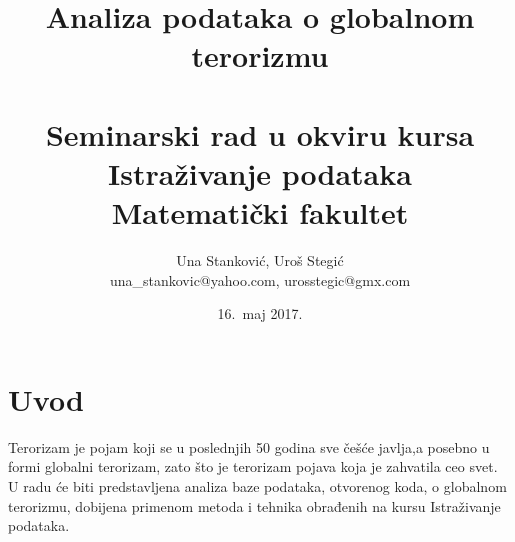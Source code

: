 \documentclass[a4paper]{article}
\begin{document}
\title{Analiza podataka o globalnom terorizmu \\ \small{~\\Seminarski rad u okviru kursa\\Istraživanje podataka\\ Matematički fakultet}}

\author{
	Una Stanković, Uroš Stegić\\
	una\_stankovic@yahoo.com, urosstegic@gmx.com}
\date{16.~maj 2017.}
\maketitle


\tableofcontents

\newpage


\section{Uvod}
\label{sec:uvod}
Terorizam je pojam koji se u poslednjih 50 godina sve češće javlja,a posebno u formi globalni terorizam, zato što je terorizam pojava koja je zahvatila ceo svet. U radu će biti predstavljena analiza baze podataka, otvorenog koda, o globalnom terorizmu, dobijena primenom metoda i tehnika obrađenih na kursu Istraživanje podataka.\\\\ 
\end{document}
